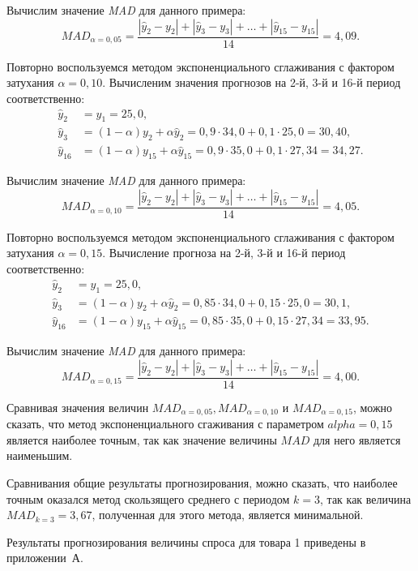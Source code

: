 Вычислим значение \textit{MAD} для данного примера:
\[
  MAD_{\alpha = 0{,}05} = \dfrac{|\hat{y}_2 - y_2| + |\hat{y}_3 - y_3| + \dots + |\hat{y}_{15} - y_{15}|}{14} = 4{,}09.
\]

Повторно воспользуемся методом экспоненциального сглаживания с фактором
затухания $\alpha=0{,}10$. Вычисленим значения прогнозов на 2-й, 3-й и 16-й период соответственно:
\begin{align*}
  \hat{y}_2 &= y_1 = 25{,}0, \\
  \hat{y}_3 &= (1 - \alpha) y_2 + \alpha \hat{y}_2 = 0{,}9 \cdot 34{,}0 + 0{,}1 \cdot 25{,}0 = 30{,}40, \\
  \hat{y}_{16} &= (1 - \alpha) y_{15} + \alpha \hat{y}_{15}  = 0{,}9 \cdot 35{,}0 + 0{,}1 \cdot 27{,}34 = 34{,}27.
\end{align*}

Вычислим значение \textit{MAD} для данного примера:
\[
  MAD_{\alpha = 0{,}10} = \dfrac{|\hat{y}_2 - y_2| + |\hat{y}_3 - y_3| + \dots + |\hat{y}_{15} - y_{15}|}{14} = 4{,}05.
\]

Повторно воспользуемся методом экспоненциального сглаживания с фактором
затухания $\alpha=0{,}15$. Вычисление прогноза на 2-й, 3-й и 16-й период соответственно:
\begin{align*}
  \hat{y}_2 &= y_1 = 25{,}0, \\
  \hat{y}_3 &= (1 - \alpha) y_2 + \alpha \hat{y}_2 = 0{,}85 \cdot 34{,}0 + 0{,}15 \cdot 25{,}0 = 30{,}1, \\
  \hat{y}_{16} &= (1 - \alpha) y_{15} + \alpha \hat{y}_{15}  = 0{,}85 \cdot 35{,}0 + 0{,}15 \cdot 27{,}34 = 33{,}95.
\end{align*}

Вычислим значение \textit{MAD} для данного примера:
\[
  MAD_{\alpha = 0{,}15} = \dfrac{|\hat{y}_2 - y_2| + |\hat{y}_3 - y_3| + \dots + |\hat{y}_{15} - y_{15}|}{14} = 4{,}00.
\]

Сравнивая значения величин $MAD_{\alpha = 0{,}05}, MAD_{\alpha = 0{,}10}$ и $MAD_{\alpha = 0{,}15}$,
можно сказать, что метод экспоненциального сгаживания с параметром $alpha = 0{,}15$
является наиболее точным, так как значение величины $MAD$ для него является наименьшим.

Сравнивания общие результаты прогнозирования, можно сказать, что наиболее точным
оказался метод скользящего среднего с периодом $k = 3$, так как величина
$ MAD_{k=3} = 3{,}67$, полученная для этого метода, является минимальной.

Результаты прогнозирования величины спроса для товара 1 приведены в приложении~А.



